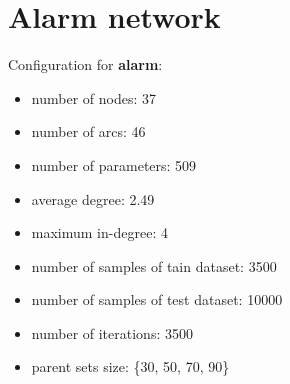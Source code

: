 \documentclass[]{scrartcl}
\begin{document}
\clearpage

\section{Alarm network}

Configuration for \textbf{alarm}:

\begin{itemize}
\item number of nodes: 37
\item number of arcs: 46
\item number of parameters: 509
\item average degree: 2.49
\item maximum in-degree: 4
\item number of samples of tain dataset: 3500
\item number of samples of test dataset: 10000
\item number of iterations: 3500
\item parent sets size: \{30, 50, 70, 90\}
\end{itemize}
\end{document}
